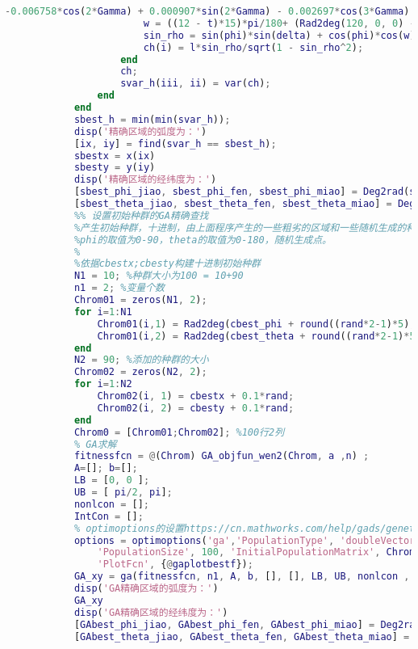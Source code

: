 \begin{lstlisting}[language = Matlab]
                    -0.006758*cos(2*Gamma) + 0.000907*sin(2*Gamma) - 0.002697*cos(3*Gamma) + 0.00148*sin(3*Gamma);%弧度
                        w = ((12 - t)*15)*pi/180+ (Rad2deg(120, 0, 0) - theta); %弧度
                        sin_rho = sin(phi)*sin(delta) + cos(phi)*cos(w)*cos(delta);
                        ch(i) = l*sin_rho/sqrt(1 - sin_rho^2);
                    end
                    ch;
                    svar_h(iii, ii) = var(ch);
                end
            end
            sbest_h = min(min(svar_h));
            disp('精确区域的弧度为：')
            [ix, iy] = find(svar_h == sbest_h);
            sbestx = x(ix)
            sbesty = y(iy)
            disp('精确区域的经纬度为：')
            [sbest_phi_jiao, sbest_phi_fen, sbest_phi_miao] = Deg2rad(sbestx)
            [sbest_theta_jiao, sbest_theta_fen, sbest_theta_miao] = Deg2rad(sbesty)
            %% 设置初始种群的GA精确查找
            %产生初始种群，十进制，由上面程序产生的一些粗劣的区域和一些随机生成的种群组成
            %phi的取值为0-90，theta的取值为0-180，随机生成点。
            %
            %依据cbestx;cbesty构建十进制初始种群
            N1 = 10; %种群大小为100 = 10+90
            n1 = 2; %变量个数
            Chrom01 = zeros(N1, 2);
            for i=1:N1
                Chrom01(i,1) = Rad2deg(cbest_phi + round((rand*2-1)*5), rand*60, rand*60);% 角度弧度化+round((rand*2-1)*1)
                Chrom01(i,2) = Rad2deg(cbest_theta + round((rand*2-1)*5), rand*60, rand*60);% 角度弧度化+round((rand*2-1)*1)
            end
            N2 = 90; %添加的种群的大小
            Chrom02 = zeros(N2, 2);
            for i=1:N2
                Chrom02(i, 1) = cbestx + 0.1*rand;
                Chrom02(i, 2) = cbesty + 0.1*rand;
            end
            Chrom0 = [Chrom01;Chrom02]; %100行2列
            % GA求解
            fitnessfcn = @(Chrom) GA_objfun_wen2(Chrom, a ,n) ;
            A=[]; b=[];
            LB = [0, 0 ];
            UB = [ pi/2, pi];
            nonlcon = [];
            IntCon = [];
            % optimoptions的设置https://cn.mathworks.com/help/gads/genetic-algorithm-options.html#f14223
            options = optimoptions('ga','PopulationType', 'doubleVector' ,...
                'PopulationSize', 100, 'InitialPopulationMatrix', Chrom0,...
                'PlotFcn', {@gaplotbestf});
            GA_xy = ga(fitnessfcn, n1, A, b, [], [], LB, UB, nonlcon , IntCon, options);
            disp('GA精确区域的弧度为：')
            GA_xy
            disp('GA精确区域的经纬度为：')
            [GAbest_phi_jiao, GAbest_phi_fen, GAbest_phi_miao] = Deg2rad(GA_xy(1))
            [GAbest_theta_jiao, GAbest_theta_fen, GAbest_theta_miao] = Deg2rad(GA_xy(2))

\end{lstlisting}
